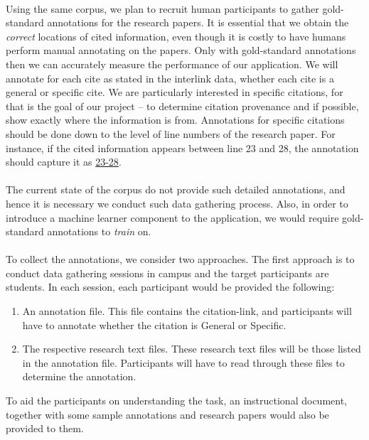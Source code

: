 \documentclass[12 pt]{article}
\begin{document}
\paragraph{}
Using the same corpus, we plan to recruit human participants to gather gold-standard annotations for the research papers. It is essential that we obtain the \textit{correct} locations of cited information, even though it is costly to have humans perform manual annotating on the papers. Only with gold-standard annotations then we can accurately measure the performance of our application. We will annotate for each cite as stated in the interlink data, whether each cite is a general or specific cite. We are particularly interested in specific citations, for that is the goal of our project -- to determine citation provenance and if possible, show exactly where the information is from. Annotations for specific citations should be done down to the level of line numbers of the research paper. For instance, if the cited information appears between line 23 and 28, the annotation should capture it as \url{23-28}.

\paragraph{}
The current state of the corpus do not provide such detailed annotations, and hence it is necessary we conduct such data gathering process. Also, in order to introduce a machine learner component to the application, we would require gold-standard annotations to \textit{train} on.

\paragraph{}
To collect the annotations, we consider two approaches. The first approach is to conduct data gathering sessions in campus and the target participants are students. In each session, each participant would be provided the following:
\begin{enumerate}
\item An annotation file. This file contains the citation-link, and participants will have to annotate whether the citation is General or Specific.
\item The respective research text files. These research text files will be those listed in the annotation file. Participants will have to read through these files to determine the annotation.
\end{enumerate}
To aid the participants on understanding the task, an instructional document, together with some sample annotations and research papers would also be provided to them.
\end{document}
